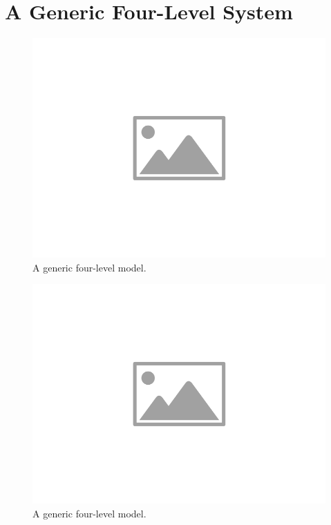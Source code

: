 \chapter{A Generic Four-Level System}\label{CH:generic}

\begin{figure}[htbp]
    \centering
    \includegraphics[width=0.75\columnwidth]{placeholder-image}
    \caption[Energy level diagram of a generic four level system.]{A generic four-level model. }
    \label{FIG:four_level_diagram}
\end{figure}
\begin{figure}[htbp]
    \centering
    \includegraphics[width=0.75\columnwidth]{placeholder-image}
    \caption[Energy level diagram of a generic four level system.]{A generic four-level model. }
    \label{FIG:four_level_leakage}
\end{figure}
